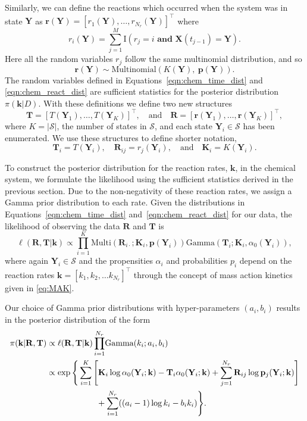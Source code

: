 \documentclass[final]{siamltex}
\begin{document}
Similarly, we can define the reactions which occurred when the system was in state $\mathbf{Y}$ as $\mathbf{r}(\mathbf{Y}) = [r_1(\mathbf{Y}), \ldots, r_{N_r}(\mathbf{Y})]^\top$ where
\[
	r_i(\mathbf{Y}) = \sum\limits_{j=1}^M \text{I}(r_j = i \textbf{ and }\mathbf{X}(t_{j-1}) = \mathbf{Y}).
\]
Here all the random variables $r_j$ follow the same multinomial distribution, and so
\begin{equation}\label{eqn:chem_react_dist}
	\mathbf{r}(\mathbf{Y}) \sim \text{Multinomial}(K(\mathbf{Y}),~\mathbf{p}(\mathbf{Y})). 
\end{equation}
The random variables defined in Equations~\eqref{eqn:chem_time_dist} and \eqref{eqn:chem_react_dist} are sufficient statistics for the posterior distribution $\pi(\mathbf{k}|D)$. With these definitions we define two new structures
\[
	\mathbf{T} = [T(\mathbf{Y}_1), \dots, T(\mathbf{Y}_K)]^\top, \quad \text{and} \quad \mathbf{R} = [\mathbf{r}(\mathbf{Y}_1), \dots, \mathbf{r}(\mathbf{Y}_K)]^\top,
\]
where $K = |\mathcal{S}|$, the number of states in $\mathcal{S}$, and each state $\mathbf{Y}_i \in \mathcal{S}$ has been enumerated. We use these structures to define shorter notation,
\[
	\mathbf{T}_i = T(\mathbf{Y}_i), \quad \mathbf{R}_{ij} = r_j(\mathbf{Y}_i), \quad \text{and} \quad \mathbf{K}_i = K(\mathbf{Y}_i).
\]

To construct the posterior distribution for the reaction rates, $\mathbf{k}$, in the chemical system, we formulate the likelihood using the sufficient statistics derived in the previous section. Due to the non-negativity of these reaction rates, we assign a Gamma prior distribution to each rate. Given the distributions in Equations~\eqref{eqn:chem_time_dist} and~\eqref{eqn:chem_react_dist} for our data, the likelihood of observing the data $\mathbf{R}$ and $\mathbf{T}$ is
\[
	\ell(\mathbf{R}, \mathbf{T}|\mathbf{k}) \propto \prod\limits_{i=1}^K \text{Multi}(\mathbf{R}_{i\cdot}; \mathbf{K}_i, \mathbf{p}(\mathbf{Y}_i))\text{Gamma}(\mathbf{T}_i; \mathbf{K}_i, \alpha_0(\mathbf{Y}_i)),
\]
where again $\mathbf{Y}_i \in \mathcal{S}$ and the propensities
$\alpha_i$ and probabilities $p_i$ depend on the reaction rates
$\mathbf{k} = [k_1, k_2, \ldots k_{N_r}]^\top$ through the concept of
mass action kinetics given in \eqref{eq:MAK}.

Our choice of Gamma prior distributions with hyper-parameters $(a_i, b_i)$ results in the posterior distribution of the form
\begin{align}
	\pi(\mathbf{k}|\mathbf{R}, \mathbf{T}) &\propto \ell(\mathbf{R}, \mathbf{T}|\mathbf{k})
	\prod_{i=1}^{N_r} \! \text{Gamma}(k_i; a_i, b_i) \notag \\
		&\propto \exp\Bigg\{\sum\limits_{i=1}^K \Bigg[
				\mathbf{K}_i\log \alpha_0(\mathbf{Y}_i; \mathbf{k}) - \mathbf{T}_i\alpha_0(\mathbf{Y}_i; \mathbf{k}) %
				+\sum_{j=1}^{N_r} \mathbf{R}_{ij}\log\mathbf{p}_j(\mathbf{Y}_i; \mathbf{k})
			\Bigg]  \notag\\
		&	\qquad\qquad\qquad{} + \sum_{i=1}^{N_r} ((a_i-1)\log k_i - b_ik_i)\Bigg\}. \label{eqn:chem_posterior}
\end{align}
\end{document}
